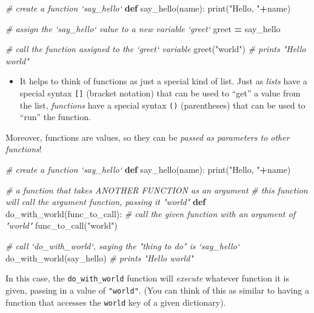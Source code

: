 \documentclass[]{book}
\newenvironment{Shaded}{\begin{snugshade}}{\end{snugshade}}
\newcommand{\KeywordTok}[1]{\textcolor[rgb]{0.13,0.29,0.53}{\textbf{#1}}}
\newcommand{\StringTok}[1]{\textcolor[rgb]{0.31,0.60,0.02}{#1}}
\newcommand{\CommentTok}[1]{\textcolor[rgb]{0.56,0.35,0.01}{\textit{#1}}}
\newcommand{\OperatorTok}[1]{\textcolor[rgb]{0.81,0.36,0.00}{\textbf{#1}}}
\newcommand{\BuiltInTok}[1]{#1}
\newcommand{\NormalTok}[1]{#1}
\providecommand{\tightlist}{%
  \setlength{\itemsep}{0pt}\setlength{\parskip}{0pt}}
\begin{document}
\begin{Shaded}
\begin{Highlighting}[]
\CommentTok{# create a function `say_hello`}
\KeywordTok{def}\NormalTok{ say_hello(name):}
    \BuiltInTok{print}\NormalTok{(}\StringTok{"Hello, "}\OperatorTok{+}\NormalTok{name)}

\CommentTok{# assign the `say_hello` value to a new variable `greet`}
\NormalTok{greet }\OperatorTok{=}\NormalTok{ say_hello}

\CommentTok{# call the function assigned to the `greet` variable}
\NormalTok{greet(}\StringTok{"world"}\NormalTok{)  }\CommentTok{# prints "Hello world"}
\end{Highlighting}
\end{Shaded}

\begin{itemize}
\tightlist
\item
  It helps to think of functions as just a special kind of list. Just as
  \emph{lists} have a special syntax \texttt{{[}{]}} (bracket notation)
  that can be used to ``get'' a value from the list, \emph{functions}
  have a special syntax \texttt{()} (parentheses) that can be used to
  ``run'' the function.
\end{itemize}

Moreover, functions are values, so they can be \emph{passed as
parameters to other functions}!

\begin{Shaded}
\begin{Highlighting}[]
\CommentTok{# create a function `say_hello`}
\KeywordTok{def}\NormalTok{ say_hello(name):}
    \BuiltInTok{print}\NormalTok{(}\StringTok{"Hello, "}\OperatorTok{+}\NormalTok{name)}

\CommentTok{# a function that takes ANOTHER FUNCTION as an argument}
\CommentTok{# this function will call the argument function, passing it "world"}
\KeywordTok{def}\NormalTok{ do_with_world(func_to_call):}
  \CommentTok{# call the given function with an argument of "world"}
\NormalTok{  func_to_call(}\StringTok{"world"}\NormalTok{)}

\CommentTok{# call `do_with_world`, saying the "thing to do" is `say_hello`}
\NormalTok{do_with_world(say_hello)  }\CommentTok{# prints "Hello world"}
\end{Highlighting}
\end{Shaded}

In this case, the \texttt{do\_with\_world} function will \emph{execute}
whatever function it is given, passing in a value of \texttt{"world"}.
(You can think of this as similar to having a function that accesses the
\texttt{\textquotesingle{}world\textquotesingle{}} key of a given
dictionary).
\end{document}
